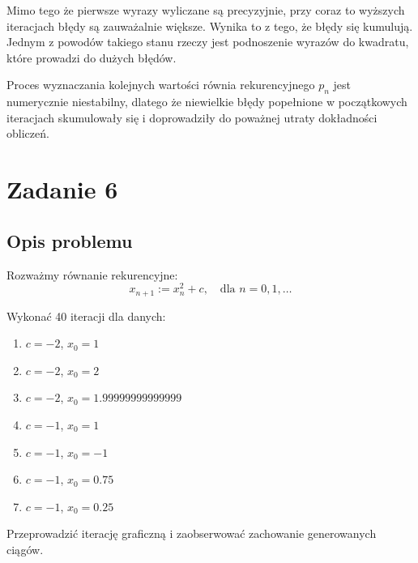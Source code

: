 \documentclass{article}
\begin{document}
Mimo tego że pierwsze wyrazy wyliczane są precyzyjnie, przy coraz to wyższych iteracjach błędy są zauważalnie większe.
Wynika to z tego, że błędy się kumulują. Jednym z powodów takiego stanu rzeczy jest podnoszenie wyrazów do kwadratu,
które prowadzi do dużych błędów.

Proces wyznaczania kolejnych wartości równia rekurencyjnego $p_n$ jest numerycznie niestabilny, dlatego że niewielkie
błędy popełnione w początkowych iteracjach skumulowały się i doprowadziły do poważnej utraty dokładności obliczeń.

\section{Zadanie 6}
\subsection{Opis problemu}
Rozważmy równanie rekurencyjne:
$$x_{n+1} := x_n^2 + c, \quad \text{dla } n = 0, 1, \dots$$

\noindent Wykonać 40 iteracji dla danych:
\begin{enumerate}
    \item $c = -2$, $x_0 = 1$
    \item $c = -2$, $x_0 = 2$
    \item $c = -2$, $x_0 = 1.99999999999999$
    \item $c = -1$, $x_0 = 1$
    \item $c = -1$, $x_0 = -1$
    \item $c = -1$, $x_0 = 0.75$
    \item $c = -1$, $x_0 = 0.25$
\end{enumerate}

\noindent Przeprowadzić iterację graficzną i zaobserwować zachowanie generowanych ciągów.
\end{document}
